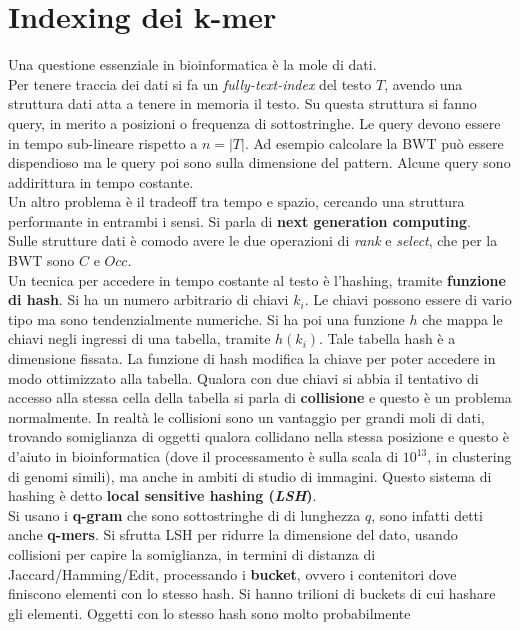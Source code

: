 \documentclass[a4paper,12pt, oneside]{book}
\begin{document}
\chapter{Indexing dei k-mer}
Una questione essenziale in bioinformatica è la mole di dati.\\
Per tenere traccia dei dati si fa un \textit{fully-text-index} del testo $T$,
avendo una struttura dati atta a tenere in memoria il testo. Su questa struttura
si fanno query, in merito a posizioni o frequenza di sottostringhe. Le query
devono essere in tempo sub-lineare rispetto a $n=|T|$. Ad esempio calcolare la
BWT può essere dispendioso ma le query poi sono sulla dimensione del
pattern. Alcune query sono addirittura in tempo costante. \\
Un altro problema è il tradeoff tra tempo e spazio, cercando una struttura
performante in entrambi i sensi. Si parla di \textbf{next generation
  computing}.\\
Sulle strutture dati è comodo avere le due operazioni di \textit{rank} e
\textit{select}, che per la BWT sono $C$ e $Occ$.\\
Un tecnica per accedere in tempo costante al testo è l'hashing, tramite
\textbf{funzione di hash}. Si ha un numero arbitrario di chiavi $k_i$. Le chiavi
possono essere di vario tipo ma sono tendenzialmente numeriche. Si ha poi una
funzione $h$ che mappa le chiavi negli ingressi di una tabella, tramite
$h(k_i)$. Tale tabella hash è a dimensione fissata. La funzione di hash modifica
la chiave per poter accedere in modo ottimizzato alla tabella. Qualora con due
chiavi si abbia il tentativo di accesso alla stessa cella della tabella si parla
di \textbf{collisione} e questo è un problema normalmente. In realtà le
collisioni sono un vantaggio per grandi moli di dati, trovando somiglianza di
oggetti qualora collidano nella stessa posizione e questo è d'aiuto in
bioinformatica (dove il processamento è sulla scala di $10^{13}$, in clustering
di genomi simili), ma anche in
ambiti di studio di immagini. Questo sistema di hashing è detto \textbf{local
  sensitive hashing (\textit{LSH})}.\\
Si usano i \textbf{q-gram} che sono sottostringhe di di lunghezza $q$, sono
infatti detti anche \textbf{q-mers}. Si sfrutta LSH per ridurre la dimensione
del dato, usando collisioni per capire la somiglianza, in termini di distanza di
Jaccard/Hamming/Edit, processando i \textbf{bucket}, ovvero i contenitori dove
finiscono elementi con lo stesso hash. Si hanno trilioni di buckets di cui
hashare gli elementi. Oggetti con lo stesso hash sono molto probabilmente
\end{document}
